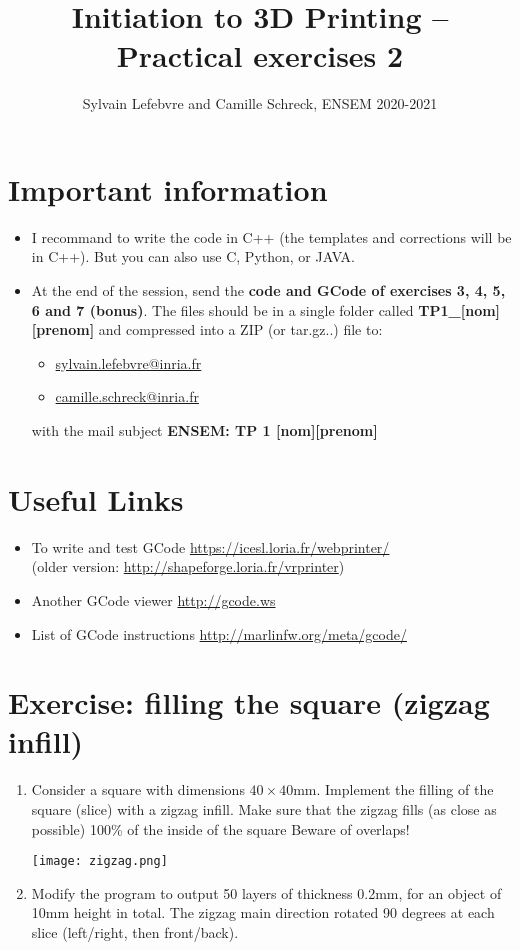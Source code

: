 \documentclass{article}
\date{\displaydate{date}}
\title{Initiation to 3D Printing -- Practical exercises 2}
\author{Sylvain Lefebvre and Camille Schreck, ENSEM 2020-2021}
\begin{document}
\maketitle

\section{Important information}
\begin{itemize}
    \item I recommand to write the code in C++ (the templates and corrections will be in C++). But you can also use C, Python, or JAVA.
    \item At the end of the session, send the {\bfseries code and GCode of exercises 3, 4, 5, 6 and 7 (bonus)}. The files should be in a single folder called {\bfseries TP1\_[nom][prenom]} and compressed into a ZIP (or tar.gz..) file to:
    \begin{itemize}
        \item \href{mailto:sylvain.lefebvre@inria.fr}{sylvain.lefebvre@inria.fr}
        \item \href{mailto:camille.schreck@inria.fr}{camille.schreck@inria.fr}
    \end{itemize}
    with the mail subject {\bfseries ENSEM: TP 1 [nom][prenom]}
\end{itemize}


\section{Useful Links}

\begin{itemize}
	\item To write and test GCode \url{https://icesl.loria.fr/webprinter/}\\ (older version: \url{http://shapeforge.loria.fr/vrprinter})
	\item Another GCode viewer \url{http://gcode.ws}
	\item List of GCode instructions \url{http://marlinfw.org/meta/gcode/}
\end{itemize}

\section{Exercise: filling the square (zigzag infill)}

\begin{enumerate}
    \item Consider a square with dimensions $40 \times 40$mm.
Implement the filling of the square (slice) with a zigzag infill. Make sure that the zigzag fills (as close as possible) 100\% of the inside of the square
Beware of overlaps!

\begin{center}
\texttt{[image: zigzag.png]}
\end{center}

\item Modify the program to output 50 layers of thickness 0.2mm, for an object of 10mm height in total. The zigzag main direction rotated 90 degrees at each slice (left/right, then front/back).
\end{enumerate}
\end{document}
